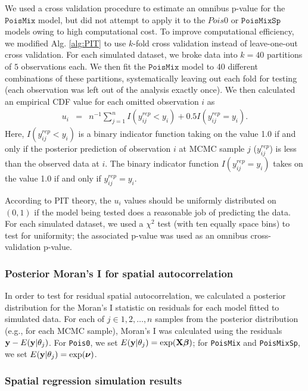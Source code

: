 \documentclass[12pt,english]{article}
\begin{document}
\begin{spacing}{1.9}
We used a cross validation procedure to estimate an omnibus p-value for the $\texttt{PoisMix}$ model, but did not attempt to apply it to the $Pois0$ or $\texttt{PoisMixSp}$ models owing to high computational cost.  To improve computational efficiency, we modified Alg. \ref{alg:PIT} to use $k$-fold cross validation instead of leave-one-out cross validation.
For each simulated dataset, we broke data into $k=40$ partitions of $5$ observations each.  We then fit the $\texttt{PoisMix}$ model to 40 different combinations of these partitions, systematically leaving out each fold for testing (each observation was left out of the analysis exactly once).  We then calculated an empirical CDF value for each omitted observation $i$ as
\begin{eqnarray*}
  u_i & = & n^{-1} \sum_{j=1}^n I(y_{ij}^{rep} < y_i) + 0.5 I(y_{ij}^{rep} = y_i).
\end{eqnarray*}
Here, $I(y_{ij}^{rep} < y_i)$ is a binary indicator function taking on the value 1.0 if and only if the posterior prediction of observation $i$ at MCMC sample $j$ ($y_{ij}^{rep}$) is less than the observed data at $i$.  The binary indicator function $I(y_{ij}^{rep} = y_i)$ takes on the value 1.0 if and only if $y_{ij}^{rep} = y_i$.

According to PIT theory, the $u_i$ values should be uniformly distributed on $(0,1)$ if the model being tested does a reasonable job of predicting the data. For each simulated dataset, we used a $\chi^2$ test (with ten equally space bins) to test for uniformity; the associated p-value was used as an omnibus cross-validation p-value.

\subsubsection{Posterior Moran's I for spatial autocorrelation}

In order to test for residual spatial autocorrelation, we calculated a posterior distribution for the Moran's I statistic on residuals for each model fitted to simulated data.  For each of $j \in 1,2,\hdots,n$ samples from the posterior distribution (e.g., for each MCMC sample), Moran's I was calculated using the residuals ${\bf y} - E({\bf y}|\theta_j)$.  For \texttt{Pois0}, we set $E({\bf y}|\theta_j) = \exp({\bf X} \boldsymbol{\beta})$; for \texttt{PoisMix} and \texttt{PoisMixSp}, we set $E({\bf y}|\theta_j) = \exp(\boldsymbol{\nu})$.


\subsubsection{Spatial regression simulation results}


\end{spacing}
\end{document}
